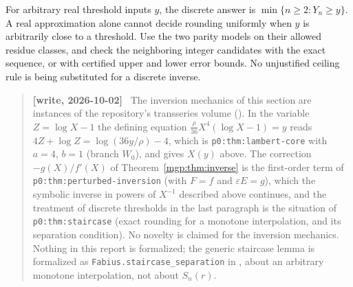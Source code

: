 \documentclass[11pt]{article}
\newenvironment{writenote}{\begin{quote}\small\sloppy\textbf{[write, 2026-10-02]}\ }{\end{quote}}
\begin{document}
For arbitrary real threshold inputs $y$, the discrete answer is $\min\{n\ge2:Y_n\ge y\}$. A real approximation alone cannot decide rounding uniformly when $y$ is arbitrarily close to a threshold. Use the two parity models on their allowed residue classes, and check the neighboring integer candidates with the exact sequence, or with certified upper and lower error bounds. No unjustified ceiling rule is being substituted for a discrete inverse.

\begin{writenote}
The inversion mechanics of this section are instances of the repository's transseries volume
(). In the variable
$Z=\log X-1$ the defining equation $\frac\rho{36}X^4(\log X-1)=y$ reads
$4Z+\log Z=\log(36y/\rho)-4$, which is \texttt{p0:thm:lambert-core} with $a=4$, $b=1$ (branch $W_0$),
and gives $X(y)$ above. The correction $-g(X)/f'(X)$ of Theorem~\ref{mgp:thm:inverse} is the first-order term of
\texttt{p0:thm:perturbed-inversion} (with $F=f$ and $\varepsilon E=g$), which the symbolic inverse in
powers of $X^{-1}$ described above continues, and
the treatment of discrete thresholds in the last paragraph is the situation of
\texttt{p0:thm:staircase} (exact rounding for a monotone interpolation, and its separation
condition). No novelty is claimed for the inversion mechanics. Nothing in this report is
formalized; the generic staircase lemma is formalized as \texttt{Fabius.staircase\_separation} in
, about an arbitrary
monotone interpolation, not about $S_n(r)$.
\end{writenote}
\end{document}
